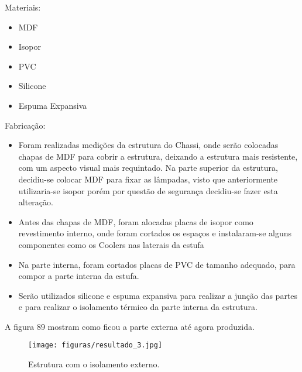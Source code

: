 Materiais:
\begin{itemize}
	\item MDF
	\item Isopor
	\item PVC
	\item Silicone
	\item Espuma Expansiva
\end{itemize}

Fabricação:
\begin{itemize}
	\item	Foram realizadas medições da estrutura do Chassi, onde serão colocadas chapas de MDF para cobrir a estrutura, deixando a estrutura mais resistente, com um aspecto visual mais requintado. Na parte superior da estrutura, decidiu-se colocar MDF para fixar as lâmpadas, visto que anteriormente utilizaria-se isopor porém por questão de segurança decidiu-se fazer esta alteração.
	\item	Antes das chapas de MDF, foram alocadas placas de isopor como revestimento interno, onde foram cortados os espaços e instalaram-se alguns componentes como os Coolers nas laterais da estufa
	\item	Na parte interna, foram cortados placas de PVC de tamanho adequado, para compor a parte interna da estufa.
	\item	Serão utilizados silicone e espuma expansiva para realizar a junção das partes e para realizar o isolamento térmico da parte interna da estrutura.
\end{itemize}

A figura 89 mostram como ficou a parte externa até agora produzida.

\begin{figure}[H]
	\centering
	\texttt{[image: figuras/resultado\_3.jpg]}
	\caption{Estrutura com o isolamento externo.} \label{resultado_3}
\end{figure}